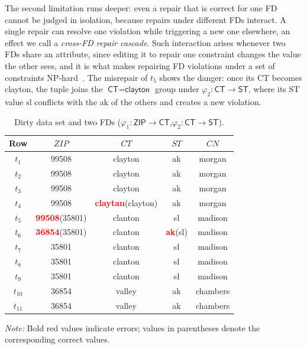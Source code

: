 \documentclass[sigconf]{acmart}
\begin{document}
The second limitation runs deeper: even a repair that is correct for one FD cannot be judged in isolation, because repairs under different FDs interact. A single repair can resolve one violation while triggering a new one elsewhere, an effect we call a \emph{cross-FD repair cascade}. Such interaction arises whenever two FDs share an attribute, since editing it to repair one constraint changes the value the other sees, and it is what makes repairing FD violations under a set of constraints NP-hard~\cite{b7}. The misrepair of $t_5$ shows the danger: once its \textsf{CT} becomes \textsf{clayton}, the tuple joins the $\textsf{CT}=\textsf{clayton}$ group under $\varphi_2: \textsf{CT} \rightarrow \textsf{ST}$, where its \textsf{ST} value \textsf{sl} conflicts with the \textsf{ak} of the others and creates a new violation.

\begin{table}[htbp]
\caption{Dirty data set and two FDs ($\varphi_1: \textsf{ZIP} \rightarrow \textsf{CT}$,$\varphi_2: \textsf{CT} \rightarrow \textsf{ST}$).}
\label{tab:motivating}
\centering
\renewcommand{\arraystretch}{1.1}
\begin{tabular}{ccccc}
\toprule
\textbf{Row} & \textbf{$ZIP$} & \textbf{$CT$} & \textbf{$ST$} & \textbf{$CN$} \\
\midrule
$t_1$ & 99508 & clayton & ak & morgan \\
$t_2$ & 99508 & clayton & ak & morgan \\
$t_3$ & 99508 & clayton & ak & morgan \\
$t_4$ & 99508 &
\textcolor{red}{\textbf{claytan}}{\scriptsize(clayton)}
& ak & morgan \\
$t_5$ &
\textcolor{red}{\textbf{99508}}{\scriptsize(35801)}
& clanton & sl & madison \\
$t_6$ &
\textcolor{red}{\textbf{36854}}{\scriptsize(35801)}
& clanton & \textcolor{red}{\textbf{ak}}{\scriptsize(sl)} & madison \\
$t_7$ & 35801 & clanton & sl & madison \\
$t_8$ & 35801 & clanton & sl & madison \\
$t_9$ & 35801 & clanton & sl & madison \\
$t_{10}$ & 36854 & valley & ak & chambers \\
$t_{11}$ & 36854 & valley & ak & chambers \\
\bottomrule
\end{tabular}

\vspace{2mm}
\footnotesize
\textit{Note:} Bold red values indicate errors; values in parentheses denote the corresponding correct values.
\end{table}
\end{document}

